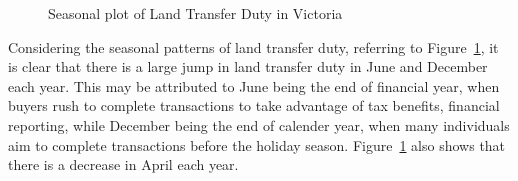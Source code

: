 \documentclass[
  11pt,
  a4paper,
]{article}
\begin{document}
\begin{figure}


\caption{\label{fig-sspattern}Seasonal plot of Land Transfer Duty in
Victoria}

\end{figure}%

Considering the seasonal patterns of land transfer duty, referring to
Figure~\ref{fig-sspattern}, it is clear that there is a large jump in
land transfer duty in June and December each year. This may be
attributed to June being the end of financial year, when buyers rush to
complete transactions to take advantage of tax benefits, financial
reporting, while December being the end of calender year, when many
individuals aim to complete transactions before the holiday season.
Figure~\ref{fig-sspattern} also shows that there is a decrease in April
each year.
\end{document}
